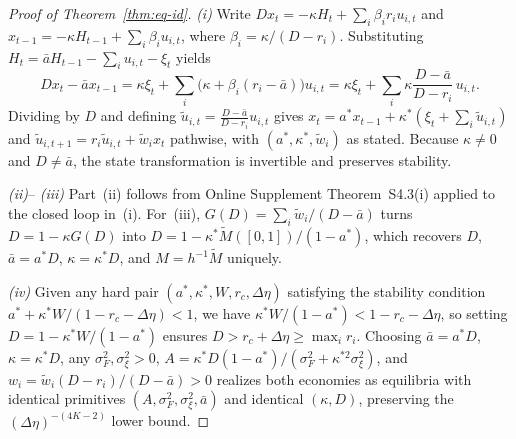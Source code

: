 \documentclass[11pt,letterpaper]{article}
\theoremstyle{definition}
\begin{document}
\begin{proof}[Proof of Theorem~\ref{thm:eq-id}]
\emph{(i)} Write $D x_t = -\kappa H_t + \sum_i \beta_i r_i u_{i,t}$ and $x_{t-1} = -\kappa H_{t-1} + \sum_i \beta_i u_{i,t}$, where $\beta_i = \kappa/(D - r_i)$. Substituting $H_t = \bar{a} H_{t-1} - \sum_i u_{i,t} - \xi_t$ yields
\[
  D x_t - \bar{a} x_{t-1} = \kappa \xi_t + \sum_i \bigl(\kappa + \beta_i(r_i - \bar{a})\bigr) u_{i,t} = \kappa \xi_t + \sum_i \kappa \frac{D - \bar{a}}{D - r_i}\, u_{i,t}.
\]
Dividing by $D$ and defining $\tilde{u}_{i,t} = \frac{D - \bar{a}}{D - r_i} u_{i,t}$ gives $x_t = a^* x_{t-1} + \kappa^*(\xi_t + \sum_i \tilde{u}_{i,t})$ and $\tilde{u}_{i,t+1} = r_i \tilde{u}_{i,t} + \tilde{w}_i x_t$ pathwise, with $(a^*, \kappa^*, \tilde{w}_i)$ as stated. Because $\kappa \neq 0$ and $D \neq \bar{a}$, the state transformation is invertible and preserves stability.

\emph{(ii)}-- \emph{(iii)} Part~(ii) follows from Online Supplement Theorem~S4.3(i) applied to the closed loop in~(i). For~(iii), $G(D) = \sum_i \tilde{w}_i/(D - \bar{a})$ turns $D = 1 - \kappa G(D)$ into $D = 1 - \kappa^* \tilde{M}([0,1])/(1 - a^*)$, which recovers $D$, $\bar{a} = a^* D$, $\kappa = \kappa^* D$, and $M = h^{-1} \tilde{M}$ uniquely.

\emph{(iv)} Given any hard pair $(a^*, \kappa^*, W, r_c, \Delta\eta)$ satisfying the stability condition $a^* + \kappa^* W / (1 - r_c - \Delta\eta) < 1$, we have $\kappa^* W / (1 - a^*) < 1 - r_c - \Delta\eta$, so setting $D = 1 - \kappa^* W/(1 - a^*)$ ensures $D > r_c + \Delta\eta \ge \max_i r_i$. Choosing $\bar{a} = a^* D$, $\kappa = \kappa^* D$, any $\sigma_F^2, \sigma_\xi^2 > 0$, $A = \kappa^* D(1 - a^*)/(\sigma_F^2 + \kappa^{*2} \sigma_\xi^2)$, and $w_i = \tilde{w}_i(D - r_i)/(D - \bar{a}) > 0$ realizes both economies as equilibria with identical primitives $(A, \sigma_F^2, \sigma_\xi^2, \bar{a})$ and identical $(\kappa, D)$, preserving the $(\Delta\eta)^{-(4K-2)}$ lower bound.
\end{proof}
\end{document}
